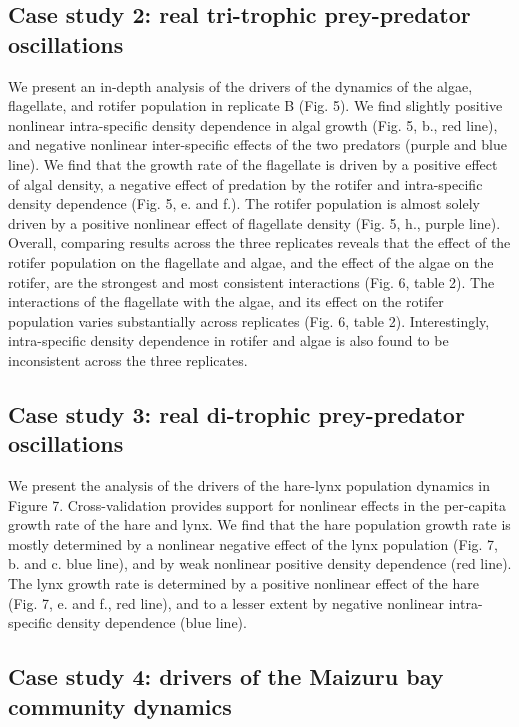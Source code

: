 \documentclass[11pt, oneside]{article}
\begin{document}
\subsection{Case study 2: real tri-trophic prey-predator oscillations}

We present an in-depth analysis of the drivers of the dynamics of the algae, flagellate, and rotifer population in replicate B (Fig. 5).
We find slightly positive nonlinear intra-specific density dependence in algal growth (Fig. 5, b., red line), and negative nonlinear inter-specific effects of the two predators (purple and blue line).
We find that the growth rate of the flagellate is driven by a positive effect of algal density, a negative effect of predation by the rotifer and intra-specific density dependence (Fig. 5, e. and f.).
The rotifer population is almost solely driven by a positive nonlinear effect of flagellate density (Fig. 5, h., purple line).
Overall, comparing results across the three replicates reveals that the effect of the rotifer population on the flagellate and algae, and the effect of the algae on the rotifer, are the strongest and most consistent interactions (Fig. 6, table 2).
The interactions of the flagellate with the algae, and its effect on the rotifer population varies substantially across replicates (Fig. 6, table 2). 
Interestingly, intra-specific density dependence in rotifer and algae is also found to be inconsistent across the three replicates.

\subsection{Case study 3: real di-trophic prey-predator oscillations}

We present the analysis of the drivers of the hare-lynx population dynamics in Figure 7.
Cross-validation provides support for nonlinear effects in the per-capita growth rate of the hare and lynx.
We find that the hare population growth rate is mostly determined by a nonlinear negative effect of the lynx population (Fig. 7, b. and c. blue line), and by weak nonlinear positive density dependence (red line). 
The lynx growth rate is determined by a positive nonlinear effect of the hare (Fig. 7, e. and f., red line), and to a lesser extent by negative nonlinear intra-specific density dependence (blue line).

\subsection{Case study 4: drivers of the Maizuru bay community dynamics}
\end{document}
